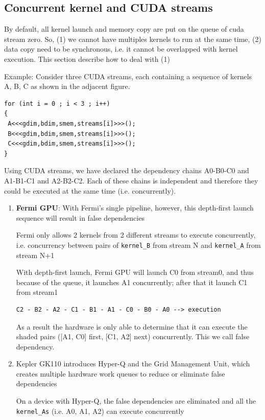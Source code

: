 \subsection{Concurrent kernel and CUDA streams}
\label{sec:cudac_streams}
\label{sec:CUDA-stream}
\label{sec:cuda_streams}

By default, all kernel launch and memory copy are put on the queue of cuda
stream zero. So, (1) we cannot have multiples kernels to run at the same time,
(2) data copy need to be synchronous, i.e. it cannot be overlapped with kernel
execution. This section describe how to deal with (1)

Example: Consider three CUDA streams, each containing a
sequence of kernels A, B, C as shown in the
adjacent figure.

\begin{lstlisting}
for (int i = 0 ; i < 3 ; i++)
{
 A<<<gdim,bdim,smem,streams[i]>>>();
 B<<<gdim,bdim,smem,streams[i]>>>();
 C<<<gdim,bdim,smem,streams[i]>>>();
}
\end{lstlisting}
Using CUDA streams, we have declared the dependency chains A0-B0-C0 and A1-B1-C1 and
A2-B2-C2. Each of these chains is independent and therefore they could be executed at the
same time (i.e. concurrently).

\begin{enumerate}
  \item {\bf Fermi GPU}: With Fermi’s single pipeline, however, this depth-first launch
sequence will result in false dependencies

Fermi only allows 2 kernels from 2 different streams to execute concurrently, i.e. 
concurrency between pairs of \verb!kernel_B! from stream N and \verb!kernel_A! from stream N+1

With depth-first launch, Fermi GPU will launch C0 from stream0, and thus because of the queue, it 
launches A1 concurrently; after that it launch C1 from stream1 
\begin{verbatim}
C2 - B2 - A2 - C1 - B1 - A1 - C0 - B0 - A0 --> execution
\end{verbatim}
As a result the hardware is only able to determine that it can execute the shaded pairs ([A1, C0] first, [C1, A2] next)
concurrently. This we call false dependency.

  \item Kepler GK110 introduces Hyper-Q and the Grid Management Unit, which creates multiple
  hardware work queues to reduce or eliminate false dependencies

On a device with Hyper-Q, the false dependencies are eliminated and all the
\verb!kernel_As! (i.e. A0, A1, A2) can execute concurrently

\end{enumerate}

